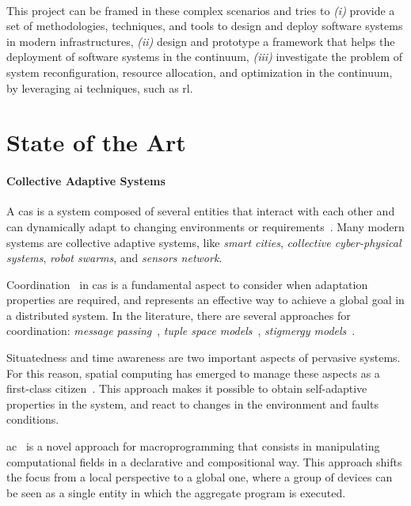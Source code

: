 \documentclass[12pt,a4paper]{article}
\begin{document}
\paragraph*{}
This project can be framed in these complex scenarios and tries to \emph{(i)} provide a set of methodologies,
techniques, and tools to design and deploy software systems in modern infrastructures,
\emph{(ii)} design and prototype a framework that helps the deployment of software systems in the continuum,
\emph{(iii)} investigate the problem of system reconfiguration, resource allocation, and optimization in the continuum,
by leveraging \ac{ai} techniques, such as \ac{rl}.

\section{State of the Art}\label{sec:state-of-the-art}

\paragraph{Collective Adaptive Systems}
A \ac{cas} is a system composed of several entities that interact with each other and can dynamically adapt to changing environments or requirements~\cite{DBLP:conf/birthday/HolzlW11}.
%
Many modern systems are collective adaptive systems,
like \emph{smart cities}, \emph{collective cyber-physical systems}, \emph{robot swarms}, and \emph{sensors network}.

Coordination~\cite{DBLP:journals/csur/Ciancarini96} in \ac{cas} is a fundamental aspect to consider when adaptation properties are required,
and represents an effective way to achieve a global goal in a distributed system.
%
In the literature,
there are several approaches for coordination:
\emph{message passing}~\cite{DBLP:journals/jacm/HondaYC16}, \emph{tuple space models}~\cite{DBLP:books/sp/omicini01/RossiCD01}, \emph{stigmergy models}~\cite{DBLP:journals/cogsr/Heylighen16}.

Situatedness and time awareness are two important aspects of pervasive systems.
%
For this reason,
spatial computing has emerged to manage these aspects as a first-class citizen~\cite{Beal_Viroli_2015}.
%
This approach makes it possible to obtain self-adaptive properties in the system,
and react to changes in the environment and faults conditions.

\ac{ac}~\cite{DBLP:journals/computer/BealPV15} is a novel approach for macroprogramming that consists in manipulating computational fields in a declarative and compositional way.
%
This approach shifts the focus from a local perspective to a global one,
where a group of devices can be seen as a single entity in which the aggregate program is executed.
\end{document}
